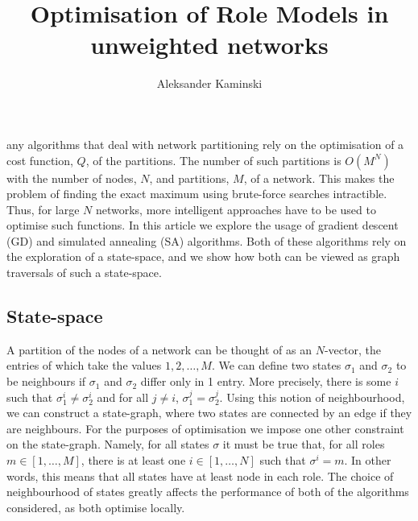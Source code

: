 \documentclass[9pt,twocolumn,twoside,lineno]{pnas-new}
\title{Optimisation of Role Models in unweighted networks}
\author[a]{Aleksander Kaminski}
\affil[a]{Mathematical Institute, University of Oxford}
\begin{document}
\maketitle
\thispagestyle{firststyle}

any algorithms that deal with network partitioning rely on the optimisation of a cost function, $Q$, of the partitions. The number of such partitions is $O(M^N)$ with the number of nodes, $N$, and partitions, $M$, of a network. This makes the problem of finding the exact maximum using brute-force searches intractible. Thus, for large $N$ networks, more intelligent approaches have to be used to optimise such functions. In this article we explore the usage of gradient descent (GD) and simulated annealing (SA) algorithms. Both of these algorithms rely on the exploration of a state-space, and we show how both can be viewed as graph traversals of such a state-space. 

\subsection*{State-space}
A partition of the nodes of a network can be thought of as an $N$-vector, the entries of which take the values  $1, 2, \ldots, M$. We can define two states $\sigma_1$ and  $\sigma_2$ to be neighbours if $\sigma_1$ and $\sigma_2$ differ only in 1 entry. More precisely, there is some  $i$ such that $\sigma_1^i \neq \sigma_2^i$ and for all $j \neq i$, $\sigma_1^j = \sigma_2^j$. Using this notion of neighbourhood, we can construct a state-graph, where two states are connected by an edge if they are neighbours. For the purposes of optimisation we impose one other constraint on the state-graph. Namely, for all states $\sigma$ it must be true that, for all roles $m \in [1, \ldots, M]$, there is at least one $i \in [1, \ldots, N]$ such that $\sigma^i = m$. In other words, this means that all states have at least node in each role. The choice of neighbourhood of states greatly affects the performance of both of the algorithms considered, as both optimise locally. 
\end{document}
